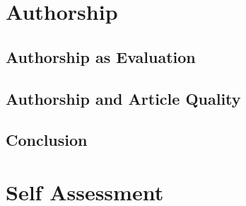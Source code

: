\documentclass[preprint,review,12pt]{elsarticle}
\begin{document}
\section{Authorship}

\subsection{Authorship as Evaluation}

\subsection{Authorship and Article Quality}

\subsection{Conclusion}

\section{Self Assessment}





% 



\section{\refname}


\end{document}
